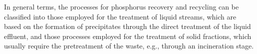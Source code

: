 \documentclass[]{elsarticle}
\begin{document}
In general terms, the processes for phosphorus recovery and recycling can be classified into those employed for the treatment of liquid streams, which are based on the formation of precipitates through the direct treatment of the liquid effluent, and those processes employed for the treatment of solid fractions, which usually require the pretreatment of the waste, e.g., through an incineration stage.



\end{document}
